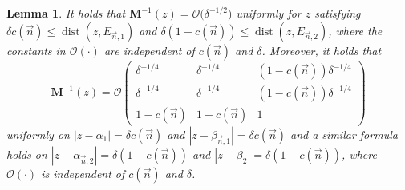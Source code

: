 \documentclass[pdftex]{sigma}
\numberwithin{equation}{section}
\newtheorem{Lemma}[Theorem]{Lemma}
\newcommand{\dist}{\operatorname{dist}}
\newcommand{\n}{{\vec n}}
\begin{document}
\begin{Lemma}
\label{lem:Mbounds2}
It holds that $ \boldsymbol M^{-1}(z) = \boldsymbol{\mathcal O}\bigl(\delta^{-1/2}\bigr) $ uniformly for $ z $ satisfying $ \delta c(\n) \leq \dist(z,E_{\n,1} ) $ and $ \delta(1-c(\n)) \leq \dist(z,E_{\n,2}) $, where the constants in $ \boldsymbol{\mathcal O}(\cdot) $ are independent of $ c(\n) $ and $ \delta $. Moreover, it holds that
\[
\boldsymbol M^{-1}(z) = \boldsymbol{\mathcal O} \begin{pmatrix} \delta^{-1/4} & \delta^{-1/4} & (1-c(\n))\delta^{-1/4} \\ \delta^{-1/4} & \delta^{-1/4} & (1-c(\n))\delta^{-1/4} \\ 1-c(\n) & 1-c(\n) & 1 \end{pmatrix}
\]
uniformly on $ |z-\alpha_1| = \delta c(\n) $ and $ |z-\beta_{\n,1}| = \delta c(\n) $ and a similar formula holds on $ |z-\alpha_{\n,2}| = \delta (1-c(\n)) $ and $ |z-\beta_2| = \delta (1-c(\n)) $, where $\boldsymbol{\mathcal O}(\cdot) $ is independent of $ c(\n) $ and $ \delta $.
\end{Lemma}
\end{document}
